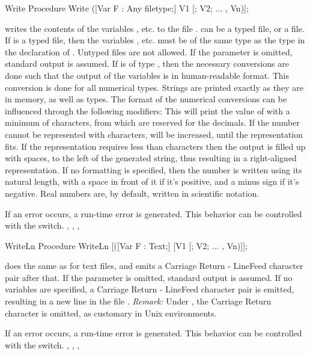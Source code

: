 \documentclass{report}
\begin{document}
\html{}
\begin{procedure}{Write}
\Declaration
Procedure Write ([Var F : Any filetype;] V1 [; V2; ... , Vn)];

\Description
{} writes the contents of the variables ,  etc. to
the file .  can be a typed file, or a  file.
If  is a typed file, then the variables ,  etc. must
be of the same type as the type in the declaration of . Untyped files
are not allowed.
If the parameter  is omitted, standard output is assumed. 
If  is of type , then the necessary conversions are done
such that the output of the variables is in human-readable format.
This conversion is done for all numerical types. Strings are printed exactly
as they are in memory, as well as  types. 
The format of the numerical conversions can be influenced through
the following modifiers:
This will print the value of  with a minimum of
 characters, from which  are reserved for the
decimals. If the number cannot be represented with  characters,
 will be increased, until the representation fits. If the
representation requires less than  characters then the output
is filled up with spaces, to the left of the generated string, thus
resulting in a right-aligned representation.
If no formatting is specified, then the number is written using its natural
length, with a space in front of it if it's positive, and a minus sign if
it's negative.
Real numbers are, by default, written in scientific notation.

\Errors
If an error occurs, a run-time error is generated. This behavior can be
controlled with the  switch. 
\SeeAlso
{}, , ,  
\end{procedure}
\begin{procedure}{WriteLn}
\Declaration
Procedure WriteLn [([Var F : Text;] [V1 [; V2; ... , Vn)]];

\Description
{} does the same as  for text files, and emits a
Carriage Return - LineFeed character pair after that.
If the parameter  is omitted, standard output is assumed. 
If no variables are specified, a Carriage Return - LineFeed character pair
is emitted, resulting in a new line in the file .
{\em Remark:} Under \linux, the Carriage Return character is omitted, as
customary in Unix environments.

\Errors
If an error occurs, a run-time error is generated. This behavior can be
controlled with the  switch. 
\SeeAlso
{}, , , 
\end{procedure}
\html{}
%
% 
\printindex
\end{document}
